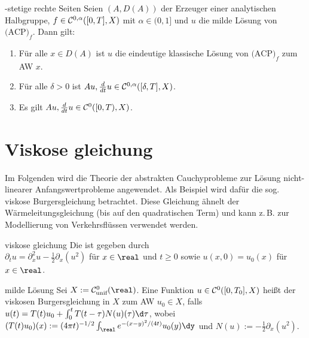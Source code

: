 \begin{Satz}{-stetige rechte Seiten}
    Seien $(A, D(A))$ der Erzeuger einer analytischen Halbgruppe,
    $f \in \mathcal{C}^{0,\alpha}([0, T], X)$ mit $\alpha \in (0, 1]$
    und $u$ die milde Lösung von $\text{(ACP)}_f$.
    Dann gilt:
    \begin{enumerate}
        \item
        Für alle $x \in D(A)$ ist $u$ die eindeutige klassische Lösung von $\text{(ACP)}_f$
        zum AW $x$.

        \item
        Für alle $\delta > 0$ ist $Au, \frac{d}{dt} u \in \mathcal{C}^{0,\alpha}([\delta, T], X)$.

        \item
        Es gilt $Au, \frac{d}{dt} u \in \mathcal{C}^0([0, T), X)$.
    \end{enumerate}
\end{Satz}

\pagebreak

\section{%
    Viskose gleichung%
}

\begin{Bem}
    Im Folgenden wird die Theorie der abstrakten Cauchyprobleme zur Lösung nicht-linearer
    Anfangswertprobleme angewendet.
    Als Beispiel wird dafür die sog. viskose Burgersgleichung betrachtet.
    Diese Gleichung ähnelt der Wärmeleitungsgleichung (bis auf den quadratischen Term) und
    kann z.\,B. zur Modellierung von Verkehrsflüssen verwendet werden.
\end{Bem}

\begin{Def}{viskose gleichung}
    Die  ist gegeben durch\\
    $\partial_t u = \partial_x^2 u - \frac{1}{2} \partial_x (u^2)$ für $x \in \real$ und $t \ge 0$
    sowie $u(x, 0) = u_0(x)$ für $x \in \real$.
\end{Def}

\begin{Def}{milde Lösung}
    Sei $X := \C^0_\unif(\real)$.
    Eine Funktion $u \in \mathcal{C}^0([0, T_0], X)$ heißt
     der viskosen Burgersgleichung in $X$ zum AW $u_0 \in X$,
    falls
    $u(t) = T(t)u_0 + \int_0^t T(t - \tau) N(u)(\tau) \d\tau$,
    wobei $(T(t)u_0)(x) := (4\pi t)^{-1/2} \int_\real e^{-(x-y)^2/(4t)} u_0(y)\dy$ und
    $N(u) := -\frac{1}{2} \partial_x (u^2)$.
\end{Def}

